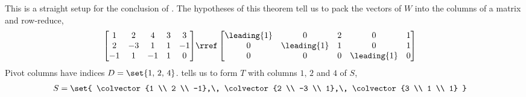 
This is a straight setup for the conclusion of .  The hypotheses of this theorem tell us to pack the vectors of $W$ into the columns of a matrix and row-reduce,
%
\begin{align*}
\begin{bmatrix}
 1 & 2 & 4 & 3 & 3 \\
 2 & -3 & 1 & 1 & -1 \\
 -1 & 1 & -1 & 1 & 0
\end{bmatrix}
&\rref
\begin{bmatrix}
 \leading{1} & 0 & 2 & 0 & 1 \\
 0 & \leading{1} & 1 & 0 & 1 \\
 0 & 0 & 0 & \leading{1} & 0
\end{bmatrix}
\end{align*}
%
Pivot columns have indices $D=\set{1,\,2,\,4}$.   tells us to form $T$ with columns $1,\,2$ and $4$ of $S$,
%
\begin{align*}
S&=
\set{
\colvector{1 \\ 2 \\ -1},\,
\colvector{2 \\ -3 \\ 1},\,
\colvector{3 \\ 1 \\ 1}
}
\end{align*}